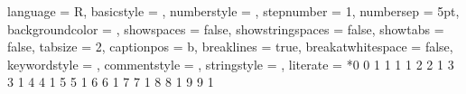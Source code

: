 {
    language = R,                                        %
    basicstyle = \small \ttfamily \color{basicstyleCol}, %
    numberstyle = \color{green},                         %
    stepnumber = 1,                                      %
    numbersep = 5pt,                                     %
    backgroundcolor = \color{backgroundCol},             %
    showspaces = false,                                  %
    showstringspaces = false,                            %
    showtabs = false,                                    %
    tabsize = 2,                                         %
    captionpos = b,                                      %
    breaklines = true,                                   %
    breakatwhitespace = false,                           %
    keywordstyle = \color{keywordstyleCol},              %
    commentstyle = \color{commentstyleCol},              %
    stringstyle = \color{stringstyleCol},                %
    literate = %
    *{0}{{{\color{NumCol} 0}}} 1
     {1}{{{\color{NumCol} 1}}} 1
     {2}{{{\color{NumCol} 2}}} 1
     {3}{{{\color{NumCol} 3}}} 1
     {4}{{{\color{NumCol} 4}}} 1
     {5}{{{\color{NumCol} 5}}} 1
     {6}{{{\color{NumCol} 6}}} 1
     {7}{{{\color{NumCol} 7}}} 1
     {8}{{{\color{NumCol} 8}}} 1
     {9}{{{\color{NumCol} 9}}} 1
}



